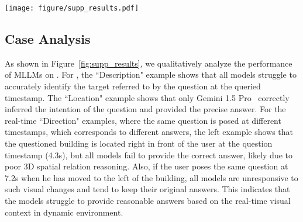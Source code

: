 \begin{table}
\caption{Results of using video \emph{vs.} QA frames (three frames for QA generation) on \datasetin.}
\label{tab:re_tab4}
\setlength{\tabcolsep}{.6em}
\centering
\fontsize{6}{8}\selectfont
{}
\end{table}


\begin{figure*}
\centering
\texttt{[image: figure/supp\_results.pdf]}
\caption{Result visualization on \dataset.}
\label{fig:supp_results}
\end{figure*}


\subsection{Case Analysis}
\label{sup:qa_case}
As shown in Figure~\ref{fig:supp_results}, we qualitatively analyze the performance of MLLMs on \dataset. For \textbf{\datasetout}, the ``Description" example shows that all models struggle to accurately identify the target referred to by the question at the queried timestamp. The ``Location" example shows that only Gemini 1.5 Pro~\cite{reid2024gemini} correctly inferred the intention of the question and provided the precise answer. For the real-time ``Direction" examples, where the same question is posed at different timestamps, which corresponds to different answers, the left example shows that the questioned building is located right in front of the user at the question timestamp (4.3s), but all models fail to provide the correct answer, likely due to poor 3D spatial relation reasoning. 
Also, if the user poses the same question at 7.2s when he has moved to the left of the building, all models are unresponsive to such visual changes and tend to keep their original answers. This indicates that the models struggle to provide reasonable answers based on the real-time visual context in dynamic environment. 

